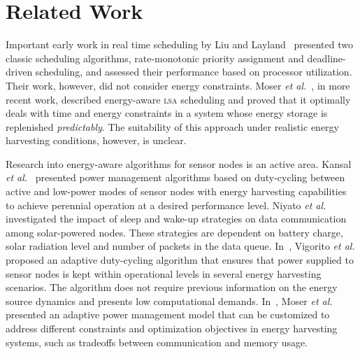 \section{Related Work} \label{sec:related work}

Important early work in real time scheduling by Liu and Layland~\cite{Liu73} presented two classic scheduling algorithms,
rate-monotonic priority assignment and deadline-driven scheduling, and assessed their performance based on processor
utilization. Their work, however, did not consider energy constraints.
Moser \emph{et al.}~\cite{moser2007real}, in more recent work, described energy-aware \textsc{lsa} scheduling
and proved that it optimally deals with time and energy constraints in a system whose energy storage is replenished
\textit{predictably}. The suitability of this approach under realistic energy harvesting conditions, however, is unclear.

Research into energy-aware algorithms for sensor nodes is an active area. Kansal \emph{et al.}~\cite{kansal2007power}
presented power management algorithms based on duty-cycling between active and low-power modes of sensor nodes
with energy harvesting capabilities to achieve perennial operation at a desired performance level.
Niyato \emph{et al.}~\cite{niyato2007sleep} investigated the impact of sleep and wake-up strategies
on data communication among solar-powered nodes. These strategies are dependent on battery charge, solar radiation
level and number of packets in the data queue. In~\cite{vigorito2007adaptive}, Vigorito \emph{et al.} proposed an adaptive
duty-cycling algorithm that ensures that power supplied to sensor nodes is kept within operational levels in several
energy harvesting scenarios. The
algorithm does not require previous information on the energy source dynamics and presents low computational
demands. In~\cite{moser2007adaptive}, Moser \emph{et al.} presented an adaptive power management
model that can be customized to address different constraints and optimization objectives in energy harvesting systems,
such as tradeoffs between communication and memory usage.

